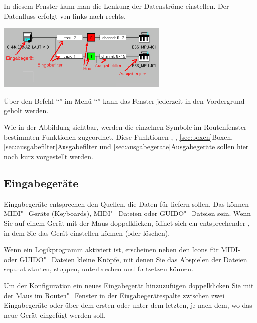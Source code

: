In diesem Fenster kann man die Lenkung der Datenströme einstellen. 
Der Datenfluss erfolgt von links nach rechts.

\begin{center}
\ifhtml
{}
\else
\includegraphics[width=234pt]{Route}
\fi
\end{center}

Über den Befehl "`"' im Menü
"`"' kann das Fenster jederzeit in den
Vordergrund geholt werden.

Wie in der Abbildung sichtbar, werden die einzelnen Symbole im
Routenfenster bestimmten Funktionen zugeordnet. Diese Funktionen
,
, \ref{sec:boxen}{Boxen}, 
\ref{sec:ausgabefilter}{Ausgabefilter} und
\ref{sec:ausgabegerate}{Ausgabegeräte} sollen hier noch kurz
vorgestellt werden.

\subsection{Eingabegeräte}\label{sec:eingabegerate}

Eingabegeräte entsprechen den Quellen, die Daten für \mutabor{} liefern 
sollen. Das können MIDI"=Geräte (Keyboards), MIDI"=Dateien 
oder GUIDO"=Dateien sein. Wenn Sie auf einem Gerät mit der Maus 
doppelklicken, öffnet sich ein entsprechender ,
in dem Sie das Gerät einstellen können (oder löschen).

Wenn ein Logikprogramm aktiviert ist, erscheinen neben den Icons 
für MIDI- oder GUIDO"=Dateien kleine Knöpfe, mit denen Sie 
das Abspielen der Dateien separat starten, stoppen, unterbrechen 
und fortsetzen können.

Um der Konfiguration ein neues Eingabegerät hinzuzufügen 
doppelklicken Sie mit der Maus im Routen"=Fenster in der Eingabegerätespalte 
zwischen zwei Eingabegeräte oder über dem ersten oder unter 
dem letzten, je nach dem, wo das neue Gerät eingefügt werden 
soll.


